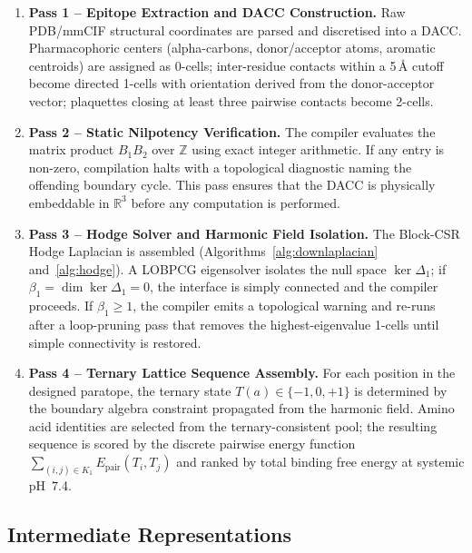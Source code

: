 \begin{enumerate}[leftmargin=1.5cm]
    \item \textbf{Pass 1 -- Epitope Extraction and DACC Construction.}
          Raw PDB/mmCIF structural coordinates are parsed and discretised
          into a DACC.  Pharmacophoric centers (alpha-carbons, donor/acceptor
          atoms, aromatic centroids) are assigned as 0-cells; inter-residue
          contacts within a 5\,\AA{} cutoff become directed 1-cells with
          orientation derived from the donor-acceptor vector; plaquettes
          closing at least three pairwise contacts become 2-cells.

    \item \textbf{Pass 2 -- Static Nilpotency Verification.}
          The compiler evaluates the matrix product $B_1 B_2$ over
          $\mathbb{Z}$ using exact integer arithmetic.  If any entry is
          non-zero, compilation halts with a topological diagnostic
          naming the offending boundary cycle.  This pass ensures that
          the DACC is physically embeddable in $\mathbb{R}^3$ before any
          computation is performed.

    \item \textbf{Pass 3 -- Hodge Solver and Harmonic Field Isolation.}
          The Block-CSR Hodge Laplacian is assembled (Algorithms~\ref{alg:downlaplacian}
          and~\ref{alg:hodge}).  A LOBPCG eigensolver isolates the null
          space $\ker \Delta_1$; if $\beta_1 = \dim\ker\Delta_1 = 0$,
          the interface is simply connected and the compiler proceeds.
          If $\beta_1 \ge 1$, the compiler emits a topological warning and
          re-runs after a loop-pruning pass that removes the highest-eigenvalue
          1-cells until simple connectivity is restored.

    \item \textbf{Pass 4 -- Ternary Lattice Sequence Assembly.}
          For each position in the designed paratope, the ternary state
          $T(a) \in \{-1, 0, +1\}$ is determined by the boundary algebra
          constraint propagated from the harmonic field.  Amino acid
          identities are selected from the ternary-consistent pool; the
          resulting sequence is scored by the discrete pairwise energy
          function $\sum_{(i,j) \in K_1} E_{\text{pair}}(T_i, T_j)$
          and ranked by total binding free energy at systemic pH~7.4.
\end{enumerate}

\subsection{Intermediate Representations}
\label{subsec:ir}

